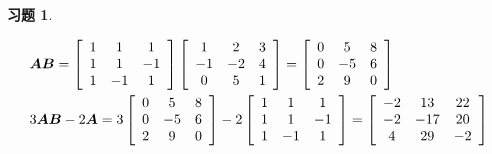 \documentclass{ctexart}
\newtheorem{problem}{习题}[section]
\begin{document}
\begin{problem}\

\begin{align*}
     & \boldsymbol{A}\boldsymbol{B}           =
    \left[\begin{array}{ccc}
            1 & 1  & 1  \\
            1 & 1  & -1 \\
            1 & -1 & 1
        \end{array}\right]
    \left[\begin{array}{ccc}
            1  & 2  & 3 \\
            -1 & -2 & 4 \\
            0  & 5  & 1
        \end{array}\right]=
    \left[\begin{array}{ccc}
            0 & 5  & 8 \\
            0 & -5 & 6 \\
            2 & 9  & 0
        \end{array}\right] \\
     & 3\boldsymbol{A}\boldsymbol{B}-2 \boldsymbol{A}  =
    3\left[\begin{array}{ccc}
            0 & 5  & 8 \\
            0 & -5 & 6 \\
            2 & 9  & 0
        \end{array}\right]
    -2\left[\begin{array}{ccc}
            1 & 1  & 1  \\
            1 & 1  & -1 \\
            1 & -1 & 1
        \end{array}\right]
    =\left[\begin{array}{ccc}
            -2 & 13  & 22 \\
            -2 & -17 & 20 \\
            4  & 29  & -2
        \end{array}\right]
\end{align*}
\end{problem}
\end{document}
